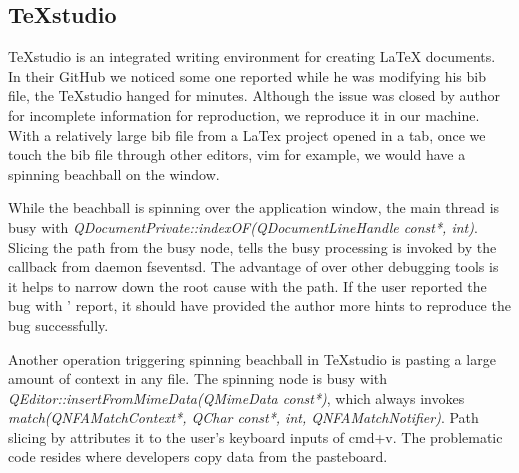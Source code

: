 \subsection{TeXstudio}

TeXstudio is an integrated writing environment for creating LaTeX documents. In
their GitHub we noticed some one reported while he was modifying his bib file,
the TeXstudio hanged for minutes. Although the issue was closed by author for
incomplete information for reproduction, we reproduce it in our machine. With a
relatively large bib file from a LaTex project opened in a tab, once we touch
the bib file through other editors, vim for example, we would have a spinning
beachball on the window.

While the beachball is spinning over the application window, the main thread
is busy with \textit{QDocumentPrivate::indexOF(QDocumentLineHandle const*,
int)}. Slicing the path from the busy node, \xxx tells the busy processing is
invoked by the callback from daemon fseventsd. The advantage of \xxx over other
debugging tools is it helps to narrow down the root cause with the
path. If the user reported the bug with \xxx' report, it should have provided
the author more hints to reproduce the bug successfully.

Another operation triggering spinning beachball in TeXstudio is pasting
a large amount of context in any file. The spinning node is busy with
\textit{QEditor::insertFromMimeData(QMimeData const*)}, which always invokes
\textit{match(QNFAMatchContext*, QChar const*, int, QNFAMatchNotifier)}. Path
slicing by \xxx attributes it to the user's keyboard inputs of cmd+v. The
problematic code resides where developers copy data from the pasteboard.
